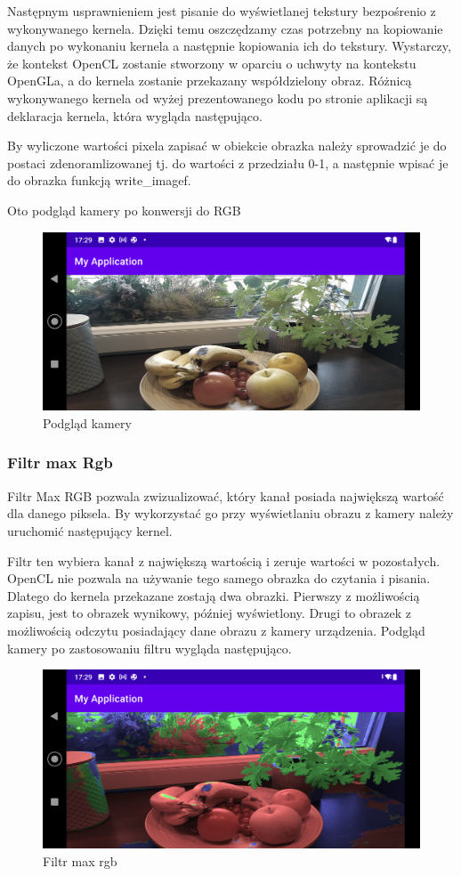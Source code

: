 Następnym usprawnieniem jest pisanie do wyświetlanej tekstury bezpośrenio z wykonywanego kernela. Dzięki temu oszczędzamy czas potrzebny na kopiowanie danych po wykonaniu kernela a następnie kopiowania ich do tekstury. Wystarczy, że kontekst OpenCL zostanie stworzony w oparciu o uchwyty na kontekstu OpenGLa, a do kernela zostanie przekazany współdzielony obraz. Różnicą wykonywanego kernela od wyżej prezentowanego kodu po stronie aplikacji są deklaracja kernela, która wygląda następująco.

By wyliczone wartości pixela zapisać w obiekcie obrazka należy sprowadzić je do postaci zdenoramlizowanej tj. do wartości z przedziału 0-1, a następnie wpisać je do obrazka funkcją write\_imagef.

Oto podgląd kamery po konwersji do RGB
\begin{figure}[H]
	\includegraphics[scale=0.16]{imgs/preview.png}
	\caption{Podgląd kamery}
\end{figure}
\subsubsection[Filtr max Rgb]{Filtr max Rgb}
Filtr Max RGB pozwala zwizualizować, który kanał posiada największą wartość dla danego piksela. By wykorzystać go przy wyświetlaniu obrazu z kamery należy uruchomić następujący kernel.

Filtr ten wybiera kanał z największą wartością i zeruje wartości w pozostałych. OpenCL nie pozwala na używanie tego samego obrazka do czytania i pisania. Dlatego do kernela przekazane zostają dwa obrazki. Pierwszy z możliwością zapisu, jest to obrazek wynikowy, później wyświetlony. Drugi to obrazek z możliwością odczytu posiadający dane obrazu z kamery urządzenia. Podgląd kamery po zastosowaniu filtru wygląda następująco.
\begin{figure}[H]
	\includegraphics[scale=0.16]{imgs/maxRgb.png}
	\caption{Filtr max rgb}
\end{figure}
